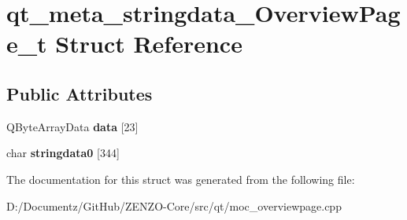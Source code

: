 \hypertarget{structqt__meta__stringdata___overview_page__t}{}\section{qt\+\_\+meta\+\_\+stringdata\+\_\+\+Overview\+Page\+\_\+t Struct Reference}
\label{structqt__meta__stringdata___overview_page__t}
\subsection*{Public Attributes}
\begin{DoxyCompactItemize}
\item 
\mbox{\label{structqt__meta__stringdata___overview_page__t_a4203d4c9239dbfe309f19443b6a226ab}} 
Q\+Byte\+Array\+Data {\bfseries data} \mbox{[}23\mbox{]}
\item 
\mbox{\label{structqt__meta__stringdata___overview_page__t_a484fdeca0ecbec37ad69aa3db3f9ff3d}} 
char {\bfseries stringdata0} \mbox{[}344\mbox{]}
\end{DoxyCompactItemize}


The documentation for this struct was generated from the following file\+:\begin{DoxyCompactItemize}
\item 
D\+:/\+Documentz/\+Git\+Hub/\+Z\+E\+N\+Z\+O-\/\+Core/src/qt/moc\+\_\+overviewpage.\+cpp\end{DoxyCompactItemize}
